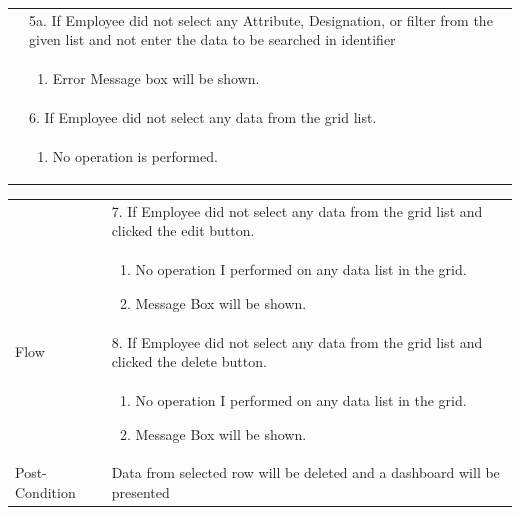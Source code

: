 \documentclass[12pt,a4paper]{report}
\begin{document}
\begin{tabular}{ | m{3cm} | m{12cm}| }
& 5a. If Employee did not select any Attribute, Designation, or filter from the given list and not enter the data to be searched in identifier \\
& \begin{enumerate}
		\item Error Message box will be shown.
	\end{enumerate}
\\  
& 6. If Employee did not select any data from the grid list.  \\
& \begin{enumerate}
		\item No operation is performed.
	\end{enumerate}
\\ \hline  
\end{tabular}

\begin{tabular}{ | m{3cm} | m{12cm}| } \hline 
& 7. If Employee did not select any data from the grid list and clicked the edit button.\\
& \begin{enumerate}
		\item No operation I performed on any data list in the grid.
            \item Message Box will be shown.
	\end{enumerate}
\\
Flow       & 8. If Employee did not select any data from the grid list and clicked the delete button.\\
 	&\begin{enumerate}
			\item No operation I performed on any data list in the grid.
            \item Message Box will be shown.
	\end{enumerate}
\\ \hline 


Post-Condition &  Data from selected row will be deleted and a dashboard will be presented  \\ \hline

\end{tabular}


\end{document}

